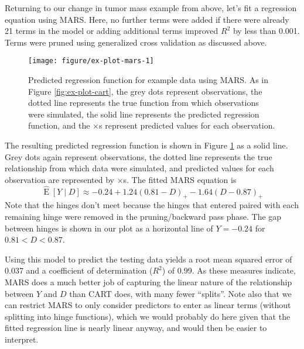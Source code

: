 \documentclass[12pt]{article}
\begin{document}
Returning to our change in tumor mass example from above, let's fit a regression equation using MARS. Here, no further terms were added if there were already 21 terms in the model or adding additional terms improved $R^2$ by less than 0.001. Terms were pruned using generalized cross validation as discussed above.

\begin{figure}[!htbp]
\centering
  \texttt{[image: figure/ex-plot-mars-1]}

\caption[Predicted regression function for example data using MARS.]{Predicted regression function for example data using MARS. As in Figure \ref{fig:ex-plot-cart}, the grey dots represent observations, the dotted line represents the true function from which observations were simulated, the solid line represents the predicted regression function, and the $\times$s represent predicted values for each observation.}\label{fig:ex-plot-mars}
\end{figure}

The resulting predicted regression function is shown in Figure \ref{fig:ex-plot-mars} as a solid line. Grey dots again represent observations, the dotted line represents the true relationship from which data were simulated, and predicted values for each observation are represented by $\times$s. The fitted MARS equation is
\begin{equation}
  \label{eq:mars-eqn}
  \hat{\operatorname{E}}[Y \mid D] \approx -0.24 + 1.24 (0.81 - D)_{+} -1.64 (D - 0.87)_{+}
\end{equation}
Note that the hinges don't meet because the hinges that entered paired with each remaining hinge were removed in the pruning/backward pass phase. The gap between hinges is shown in our plot as a horizontal line of $Y = -0.24$ for $0.81 < D < 0.87$.

Using this model to predict the testing data yields a root mean squared error of 0.037 and a coefficient of determination ($R^2$) of 0.99. As these measures indicate, MARS does a much better job of capturing the linear nature of the relationship between $Y$ and $D$ than CART does, with many fewer ``splits''. Note also that we can restrict MARS to only consider predictors to enter as linear terms (without splitting into hinge functions), which we would probably do here given that the fitted regression line is nearly linear anyway, and would then be easier to interpret.


\end{document}
